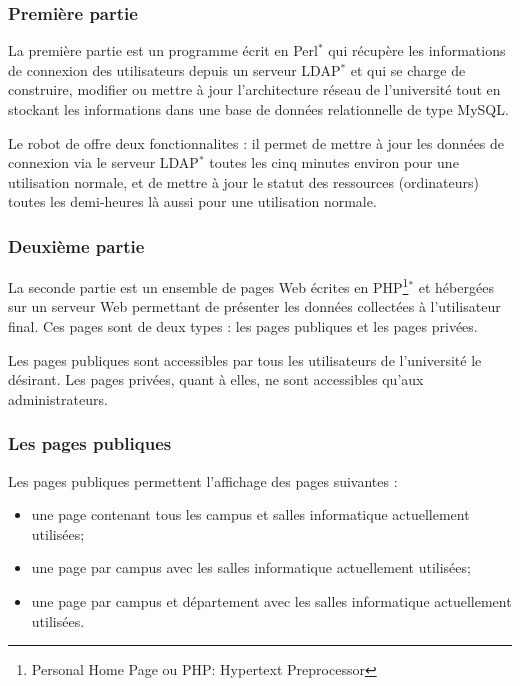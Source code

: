 \subsubsection{Premi\`ere partie}

La premi\`ere partie est un programme \'ecrit en Perl$^*$ qui r\'ecup\`ere les informations de connexion des utilisateurs depuis un serveur LDAP$^*$ et qui se charge de construire, modifier ou mettre \`a jour l'architecture r\'eseau de l'universit\'e tout en stockant les informations dans une base de donn\'ees relationnelle de type MySQL.

Le robot de \Yuukou{} offre deux fonctionnalites : il permet de mettre \`a jour les donn\'ees de connexion via le serveur LDAP$^*$ toutes les cinq minutes environ pour une utilisation normale, et de mettre \`a jour le statut des ressources (ordinateurs) toutes les demi-heures l\`a aussi pour une utilisation normale.

\subsubsection{Deuxi\`eme partie}

La seconde partie est un ensemble de pages Web \'ecrites en PHP\protect\footnote{Personal Home Page ou PHP: Hypertext Preprocessor}$^*$ et h\'eberg\'ees sur un serveur Web permettant de pr\'esenter les donn\'ees collect\'ees \`a l'utilisateur final.
Ces pages sont de deux types : les pages publiques et les pages priv\'ees.

Les pages publiques sont accessibles par tous les utilisateurs de l'universit\'e le d\'esirant.
Les pages priv\'ees, quant \`a elles, ne sont accessibles qu'aux administrateurs.

\subsubsection{Les pages publiques}

\noindent Les pages publiques permettent l'affichage des pages suivantes :
\begin{itemize}
	\item une page contenant tous les campus et salles informatique actuellement utilis\'ees;
	\item une page par campus avec les salles informatique actuellement utilis\'ees;
	\item une page par campus et d\'epartement avec les salles informatique actuellement utilis\'ees.

\end{itemize}


